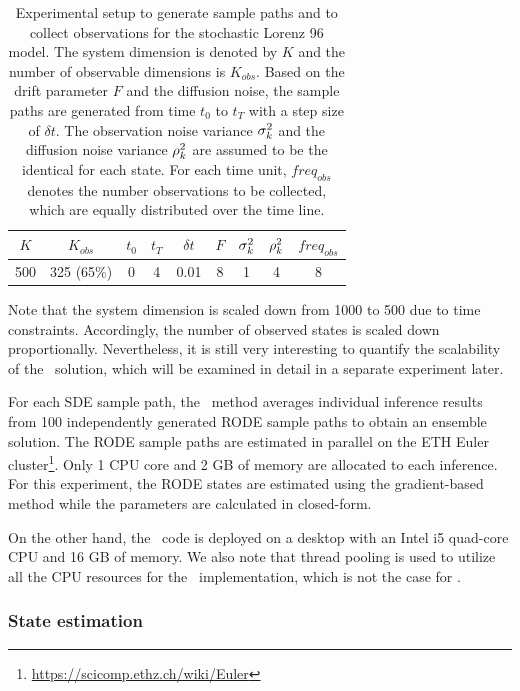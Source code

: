 \begin{table}
\centering
\caption{Experimental setup to generate sample paths and to collect observations for the stochastic Lorenz 96 model. The system dimension is denoted by $K$ and the number of observable dimensions is $K_{obs}$. Based on the drift parameter $F$ and the diffusion noise, the sample paths are generated from time $t_0$ to $t_T$ with a step size of $\delta t$. The observation noise variance $\sigma_{k}^2$ and the diffusion noise variance $\rho_{k}^2$ are assumed to be the identical for each state. For each time unit, $freq_{obs}$ denotes the number observations to be collected, which are equally distributed over the time line.}
\label{table-lorenz-96-setup}
\begin{tabular}{|c|c|c|c|c|c|c|c|c|}
\hline
$K$ & $K_{obs}$ & $t_0$ & $t_T$ & $\delta t$ & $F$ & $\sigma_{k}^2$  & $\rho_{k}^2$ & $freq_{obs}$ \\ \hline
500 & 325 (65\%) & 0 & 4 & 0.01 & 8 & 1 & 4 & 8 \\ \hline
\end{tabular}
\end{table}

Note that the system dimension is scaled down from 1000 to 500 due to time constraints.
Accordingly, the number of observed states is scaled down proportionally.
Nevertheless, it is still very interesting to quantify the scalability of the \algolpmfsde\ solution, which will be examined in detail in a separate experiment later.

For each SDE sample path, the \algolpmfsde\ method averages individual inference results from 100 independently generated RODE sample paths to obtain an ensemble solution.
The RODE sample paths are estimated in parallel on the ETH Euler cluster\footnote{\url{https://scicomp.ethz.ch/wiki/Euler}}.
Only 1 CPU core and 2 GB of memory are allocated to each inference.
For this experiment, the RODE states are estimated using the gradient-based method while the parameters are calculated in closed-form.

On the other hand, the \algovgpamf\ code is deployed on a desktop with an Intel i5 quad-core CPU and 16 GB of memory.
We also note that thread pooling is used to utilize all the CPU resources for the \algovgpamf\ implementation, which is not the case for \algolpmfsde.

\subsubsection*{State estimation}

